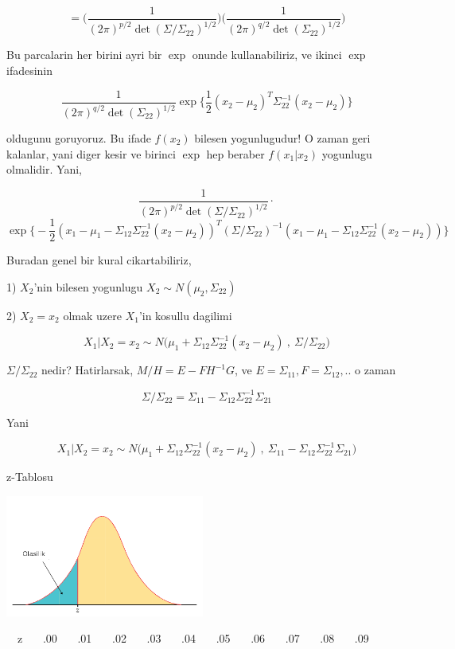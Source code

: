 \documentclass[12pt,fleqn]{article}\usepackage{../common}
\begin{document}
\[ =
\bigg( \frac{ 1}{(2\pi)^{p/2} \det(\Sigma/\Sigma_{22})^{1/2}} \bigg)
\bigg( \frac{ 1}{(2\pi)^{q/2} \det(\Sigma_{22})^{1/2}} \bigg)
 \]

Bu parcalarin her birini ayri bir $\exp$ onunde kullanabiliriz, ve ikinci $\exp$
ifadesinin 

\[ 
\frac{ 1}{(2\pi)^{q/2} \det(\Sigma_{22})^{1/2}}
\exp \bigg\{
\frac{ 1}{2}(x_2-\mu_2)^T\Sigma_{22}^{-1} (x_2-\mu_2)
 \bigg\}
 \]


oldugunu goruyoruz. Bu ifade $f(x_2)$ bilesen yogunlugudur! O zaman geri
kalanlar, yani diger kesir ve birinci $\exp$ hep beraber $f(x_1|x_2)$
yogunlugu olmalidir. Yani,

\[ 
\frac{ 1}{(2\pi)^{p/2} \det(\Sigma/\Sigma_{22})^{1/2}} \cdot
 \]
\[ 
\exp \bigg\{
-\frac{1 }{2} 
(x_1 - \mu_1 - \Sigma_{12}\Sigma_{22}^{-1} (x_2 - \mu_2))^T 
(\Sigma/\Sigma_{22})^{-1} 
(x_1 - \mu_1 - \Sigma_{12}\Sigma_{22}^{-1} (x_2 - \mu_2))
\bigg\}
 \]

Buradan genel bir kural cikartabiliriz, 

1) $X_2$'nin bilesen yogunlugu $X_2 \sim N(\mu_2, \Sigma_{22})$

2) $X_2 = x_2$ olmak uzere $X_1$'in kosullu dagilimi 

\[ X_1 | X_2 = x_2 \sim 
N\bigg(\mu_1 + \Sigma_{12}\Sigma_{22}^{-1} (x_2 -\mu_2) \ , \
\Sigma/\Sigma_{22} \bigg)
 \]

$\Sigma/\Sigma_{22}$ nedir? Hatirlarsak, $M/H = E-FH^{-1}G$, ve 
$E = \Sigma_{11},F=\Sigma_{12},..$ o zaman 

\[ \Sigma/\Sigma_{22} = \Sigma_{11}-\Sigma_{12} \Sigma_{22}^{-1} \Sigma_{21} \]

Yani

\[ X_1 | X_2 = x_2 \sim 
N\bigg(\mu_1 + \Sigma_{12}\Sigma_{22}^{-1} (x_2 -\mu_2) \ , \
\Sigma_{11}-\Sigma_{12} \Sigma_{22}^{-1} \Sigma_{21}
\bigg)
 \]

z-Tablosu

\includegraphics[height=4cm]{90_1.png}

\ \ z \ \ \  .00  \ \ \ .01 \ \ \ .02 \ \ \ .03 \ \ \ .04 \ \ \ .05 \ \ \ .06 \
\ \ .07 \ \ \ .08 \ \ \ .09
\end{document}
